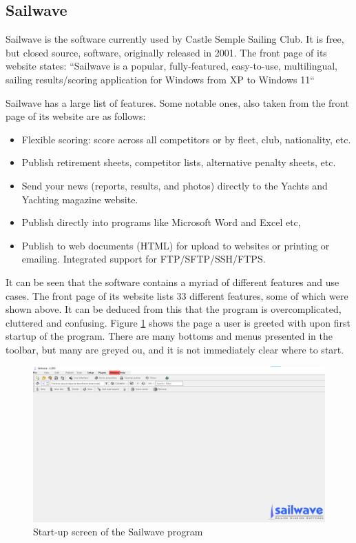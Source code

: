 \documentclass{l4proj}
\begin{document}
\subsection{Sailwave}
Sailwave \citet{sailwave} is the software currently used by Castle Semple Sailing Club. It is free, but closed source, software, originally released in 2001.
The front page of its website \citep{sailwave} states: “Sailwave is a popular, fully-featured, easy-to-use, multilingual, sailing results/scoring application for Windows from XP to Windows 11“

Sailwave has a large list of features. Some notable ones, also taken from the front page of its website \citep{sailwave} are as follows:
\begin{itemize}
    \item
    Flexible scoring: score across all competitors or by fleet, club, nationality, etc.
    \item
    Publish retirement sheets, competitor lists, alternative penalty sheets, etc.
    \item
    Send your news (reports, results, and photos) directly to the Yachts and Yachting magazine website.
    \item
    Publish directly into programs like Microsoft Word and Excel etc,
    \item
    Publish to web documents (HTML) for upload to websites or printing or emailing. Integrated support for FTP/SFTP/SSH/FTPS.
\end{itemize}

It can be seen that the software contains a myriad of different features and use cases. The front page of its website lists 33 different features, some of which were shown above. It can be deduced from this that the program is overcomplicated, cluttered and confusing.
Figure \ref{fig:SailwaveEmpty} shows the page a user is greeted with upon first startup of the program. There are many bottoms and menus presented in the toolbar, but many are greyed ou, and it is not immediately clear where to start.

\begin{figure}[H]
    \centering
    \includegraphics[width=1\linewidth]{images/SailwaveEmpty.png} 

    \caption{Start-up screen of the Sailwave program \citep{sailwave}
    }

    \label{fig:SailwaveEmpty} 
\end{figure}
\end{document}
